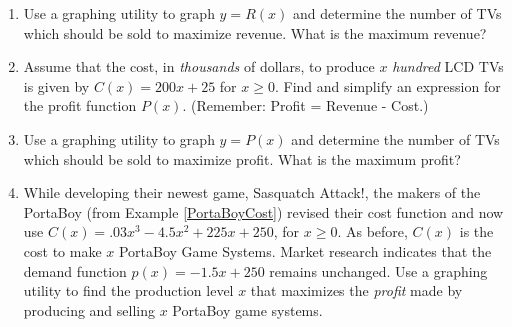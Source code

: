 \begin{enumerate}
\setcounter{enumi}{\value{HW}}

\item  Use a graphing utility to graph $y = R(x)$ and determine the number of TVs which should be sold to maximize revenue.  What is the maximum revenue? \label{lcdmaxprofitexerfirst}

\item Assume that the cost, in \textit{thousands} of dollars, to produce $x$ \textit{hundred} LCD TVs is given by $C(x) = 200x + 25$ for $x \geq 0$. Find and simplify an expression for the profit function $P(x)$.  (Remember: Profit = Revenue - Cost.)

\item  Use a graphing utility to graph $y = P(x)$ and determine the number of TVs which should be sold to maximize profit.  What is the maximum  profit? \label{lcdmaxprofitexerlast}

\item \label{newportaboycost} While developing their newest game, Sasquatch Attack!, the makers of the PortaBoy (from Example \ref{PortaBoyCost}) revised their cost function and now use $C(x) = .03x^{3} - 4.5x^{2} + 225x + 250$, for $x \geq 0$. As before, $C(x)$ is the cost to make $x$ PortaBoy Game Systems.  Market research indicates that the demand function $p(x) = -1.5x + 250$ remains unchanged.  Use a graphing utility to find the production level $x$ that maximizes the \textit{profit} made by producing and selling $x$ PortaBoy game systems.

\setcounter{HW}{\value{enumi}}
\end{enumerate}

